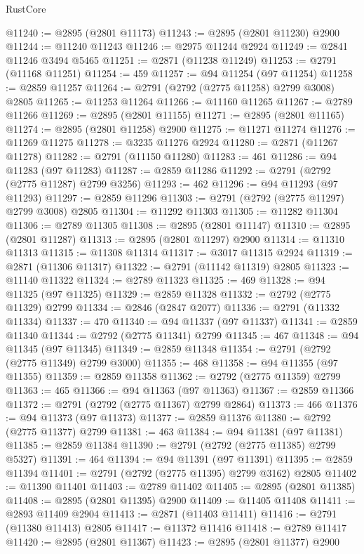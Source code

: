 \begin{lexlean}{RustCore}
\begin{coremodule}
@11240 := @2895 (@2801 @11173)
@11243 := @2895 (@2801 @11230) @2900
@11244 := @11240 @11243
@11246 := @2975 @11244 @2924
@11249 := @2841 @11246 @3494 @5465
@11251 := @2871 (@11238 @11249)
@11253 := @2791 (@11168 @11251)
@11254 := 459
@11257 := @94 @11254 (@97 @11254)
@11258 := @2859 @11257
@11264 := @2791 (@2792 (@2775 @11258) @2799 @3008) @2805
@11265 := @11253 @11264
@11266 := @11160 @11265
@11267 := @2789 @11266
@11269 := @2895 (@2801 @11155)
@11271 := @2895 (@2801 @11165)
@11274 := @2895 (@2801 @11258) @2900
@11275 := @11271 @11274
@11276 := @11269 @11275
@11278 := @3235 @11276 @2924
@11280 := @2871 (@11267 @11278)
@11282 := @2791 (@11150 @11280)
@11283 := 461
@11286 := @94 @11283 (@97 @11283)
@11287 := @2859 @11286
@11292 := @2791 (@2792 (@2775 @11287) @2799 @3256)
@11293 := 462
@11296 := @94 @11293 (@97 @11293)
@11297 := @2859 @11296
@11303 := @2791 (@2792 (@2775 @11297) @2799 @3008) @2805
@11304 := @11292 @11303
@11305 := @11282 @11304
@11306 := @2789 @11305
@11308 := @2895 (@2801 @11147)
@11310 := @2895 (@2801 @11287)
@11313 := @2895 (@2801 @11297) @2900
@11314 := @11310 @11313
@11315 := @11308 @11314
@11317 := @3017 @11315 @2924
@11319 := @2871 (@11306 @11317)
@11322 := @2791 (@11142 @11319) @2805
@11323 := @11140 @11322
@11324 := @2789 @11323
@11325 := 469
@11328 := @94 @11325 (@97 @11325)
@11329 := @2859 @11328
@11332 := @2792 (@2775 @11329) @2799
@11334 := @2846 (@2847 @2077)
@11336 := @2791 (@11332 @11334)
@11337 := 470
@11340 := @94 @11337 (@97 @11337)
@11341 := @2859 @11340
@11344 := @2792 (@2775 @11341) @2799
@11345 := 467
@11348 := @94 @11345 (@97 @11345)
@11349 := @2859 @11348
@11354 := @2791 (@2792 (@2775 @11349) @2799 @3000)
@11355 := 468
@11358 := @94 @11355 (@97 @11355)
@11359 := @2859 @11358
@11362 := @2792 (@2775 @11359) @2799
@11363 := 465
@11366 := @94 @11363 (@97 @11363)
@11367 := @2859 @11366
@11372 := @2791 (@2792 (@2775 @11367) @2799 @2864)
@11373 := 466
@11376 := @94 @11373 (@97 @11373)
@11377 := @2859 @11376
@11380 := @2792 (@2775 @11377) @2799
@11381 := 463
@11384 := @94 @11381 (@97 @11381)
@11385 := @2859 @11384
@11390 := @2791 (@2792 (@2775 @11385) @2799 @5327)
@11391 := 464
@11394 := @94 @11391 (@97 @11391)
@11395 := @2859 @11394
@11401 := @2791 (@2792 (@2775 @11395) @2799 @3162) @2805
@11402 := @11390 @11401
@11403 := @2789 @11402
@11405 := @2895 (@2801 @11385)
@11408 := @2895 (@2801 @11395) @2900
@11409 := @11405 @11408
@11411 := @2893 @11409 @2904
@11413 := @2871 (@11403 @11411)
@11416 := @2791 (@11380 @11413) @2805
@11417 := @11372 @11416
@11418 := @2789 @11417
@11420 := @2895 (@2801 @11367)
@11423 := @2895 (@2801 @11377) @2900

\end{coremodule}
\end{lexlean}
